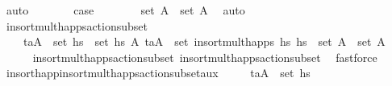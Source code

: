 \begin{isabellebody}
\ auto\isanewline
\ \ \ \ \isamarkupfalse%
\ \isamarkupfalse%
\ {\isacharquery}{\kern0pt}case\isanewline
\ \ \ \ \ \ \isamarkupfalse%
\ {\isacartoucheopen}set\ A\ {\isasymsubseteq}\ set\ A{\isacharprime}{\kern0pt}{\isacartoucheclose}\ \isamarkupfalse%
\ auto\isanewline
\ \ \isamarkupfalse%
%
\endisatagproof
{\isafoldproof}%
%
\isadelimproof
\isanewline
%
\endisadelimproof
\isanewline
\ \ \isamarkupfalse%
\ insort{\isacharunderscore}{\kern0pt}mult{\isacharunderscore}{\kern0pt}happs{\isacharunderscore}{\kern0pt}action{\isacharunderscore}{\kern0pt}subset{\isacharcolon}{\kern0pt}\ \isanewline
\ \ \ \ {\isachardoublequoteopen}{\isasymforall}{\isacharparenleft}{\kern0pt}t\isactrlsub a{\isacharcomma}{\kern0pt}A{\isacharparenright}{\kern0pt}\ {\isasymin}\ set\ hs\ {\isasymunion}\ set\ hs\ {\isasymexists}A{\isacharprime}{\kern0pt}{\isachardot}{\kern0pt}\ {\isacharparenleft}{\kern0pt}t\isactrlsub a{\isacharcomma}{\kern0pt}A{\isacharprime}{\kern0pt}{\isacharparenright}{\kern0pt}\ {\isasymin}\ set\ {\isacharparenleft}{\kern0pt}insort{\isacharunderscore}{\kern0pt}mult{\isacharunderscore}{\kern0pt}happs\ hs\ hs\ {\isasymand}\ set\ A\ {\isasymsubseteq}\ set\ A{\isacharprime}{\kern0pt}{\isachardoublequoteclose}\isanewline
%
\isadelimproof
\ \ \ \ %
\endisadelimproof
%
\isatagproof
{}\isamarkupfalse%
\ insort{\isacharunderscore}{\kern0pt}mult{\isacharunderscore}{\kern0pt}happs{\isacharunderscore}{\kern0pt}action{\isacharunderscore}{\kern0pt}subset{}\ insort{\isacharunderscore}{\kern0pt}mult{\isacharunderscore}{\kern0pt}happs{\isacharunderscore}{\kern0pt}action{\isacharunderscore}{\kern0pt}subset{}\ \isamarkupfalse%
\ fastforce%
\endisatagproof
{\isafoldproof}%
%
\isadelimproof
\isanewline
%
\endisadelimproof
\isanewline
\ \ \isamarkupfalse%
\ insort{\isacharunderscore}{\kern0pt}happ{}{\isacharunderscore}{\kern0pt}insort{\isacharunderscore}{\kern0pt}mult{\isacharunderscore}{\kern0pt}happs{\isacharunderscore}{\kern0pt}action{\isacharunderscore}{\kern0pt}subset{\isacharunderscore}{\kern0pt}aux{\isacharcolon}{\kern0pt}\isanewline
\ \ \ \ \ {\isachardoublequoteopen}{\isacharparenleft}{\kern0pt}t\isactrlsub a{\isacharcomma}{\kern0pt}A{\isacharparenright}{\kern0pt}\ {\isasymin}\ set\ hs\ \isanewline

\end{isabellebody}
